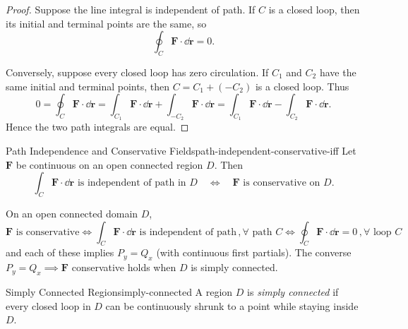 \begin{proof}
  Suppose the line integral is independent of path. If $C$ is a closed loop, then
  its initial and terminal points are the same, so
  \[
    \oint_C \mathbf{F}\cdot \dd{\mathbf{r}}=0.
  \]

  Conversely, suppose every closed loop has zero circulation. If $C_1$ and $C_2$
  have the same initial and terminal points, then $C=C_1+(-C_2)$ is a closed loop.
  Thus
  \[
    0
    =
    \oint_C \mathbf{F}\cdot \dd{\mathbf{r}}
    =
    \int_{C_1}\mathbf{F}\cdot \dd{\mathbf{r}}
    +
    \int_{-C_2}\mathbf{F}\cdot \dd{\mathbf{r}}
    =
    \int_{C_1}\mathbf{F}\cdot \dd{\mathbf{r}}
    -
    \int_{C_2}\mathbf{F}\cdot \dd{\mathbf{r}}.
  \]
  Hence the two path integrals are equal.
\end{proof}

\begin{center}
\end{center}

\begin{theorem}{Path Independence and Conservative Fields}{path-independent-conservative-iff}
  Let $\mathbf{F}$ be continuous on an open connected region $D$. Then
  \[
    \int_C \mathbf{F}\cdot \dd{\mathbf{r}}
    \text{ is independent of path in }D
    \quad\Longleftrightarrow\quad
    \mathbf{F}\text{ is conservative on }D.
  \]
\end{theorem}

\begin{remark}
  On an open connected domain $D$,
  \[
    \mathbf{F} \text{ is conservative} \iff \int_C \mathbf{F} \cdot \dd{\mathbf{r}} \text{ is independent of path} \,, \forall \text{ path } C \iff \oint_C \mathbf{F} \cdot \dd{\mathbf{r}} = 0 \,, \forall \text{ loop } C
  \]
  and each of these implies $P_y = Q_x$ (with continuous first partials). The converse $P_y = Q_x \implies \mathbf{F}$ conservative holds when $D$ is simply connected.
\end{remark}

\begin{definition}{Simply Connected Region}{simply-connected}
  A region $D$ is \emph{simply connected} if every closed loop in $D$ can be
  continuously shrunk to a point while staying inside $D$.
\end{definition}

